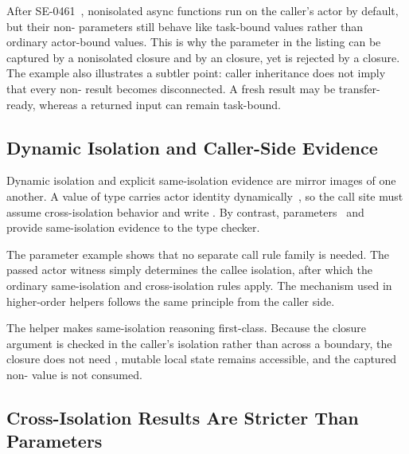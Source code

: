 
After SE-0461~\cite{se0461}, nonisolated async functions run on the caller's actor by default, but their non- parameters still behave like task-bound values rather than ordinary actor-bound values. This is why the parameter in the listing can be captured by a nonisolated closure and by an  closure, yet is rejected by a  closure. The example also illustrates a subtler point: caller inheritance does not imply that every non- result becomes disconnected. A fresh result may be transfer-ready, whereas a returned input can remain task-bound.

\subsection{Dynamic Isolation and Caller-Side Evidence}


Dynamic isolation and explicit same-isolation evidence are mirror images of one another. A value of type  carries actor identity dynamically~\cite{se0431}, so the call site must assume cross-isolation behavior and write . By contrast,  parameters~\cite{se0313} and ~\cite{se0420} provide same-isolation evidence to the type checker.


The  parameter example shows that no separate call rule family is needed. The passed actor witness simply determines the callee isolation, after which the ordinary same-isolation and cross-isolation rules apply. The  mechanism used in higher-order helpers follows the same principle from the caller side.


The  helper makes same-isolation reasoning first-class. Because the closure argument is checked in the caller's isolation rather than across a boundary, the closure does not need , mutable local state remains accessible, and the captured non- value is not consumed.

\subsection{Cross-Isolation Results Are Stricter Than Parameters}

